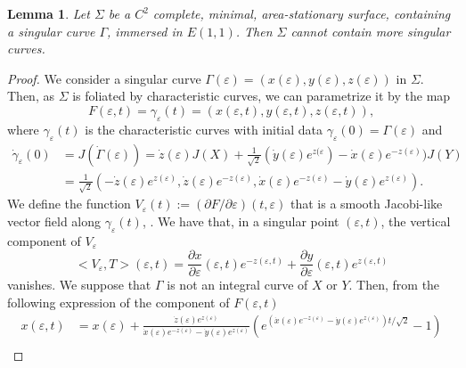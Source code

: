 \documentclass[10pt]{amsart}
\newtheorem{lemma}[theorem]{Lemma}
\theoremstyle{definition}
\theoremstyle{remark}
\numberwithin{equation}{section}
\begin{document}
\begin{lemma} Let ${\Sigma}$ be a $C^2$ complete, minimal, area-stationary surface, containing a singular curve ${\Gamma}$, immersed in ${E(1,1)}$. Then ${\Sigma}$ cannot contain more singular curves. 
\end{lemma}

\begin{proof} We consider a singular curve ${\Gamma}({\varepsilon})=(x({\varepsilon}),y({\varepsilon}),z({\varepsilon}))$ in ${\Sigma}$. Then, as ${\Sigma}$ is foliated by characteristic curves, we can parametrize it by the map 
\[
F({\varepsilon},t)={\gamma}_{\varepsilon}(t)=(x({\varepsilon},t),y({\varepsilon},t),z({\varepsilon},t)),
\]
where ${\gamma}_{\varepsilon}(t)$ is the characteristic curves with initial data ${\gamma}_{\varepsilon}(0)={\Gamma}({\varepsilon})$ and 
\begin{equation}
\begin{split}
\dot{\gamma}_{\varepsilon}(0)&=J(\dot{\Gamma}({\varepsilon}))=\dot{z}({\varepsilon})J(X)+\frac{1}{\sqrt{2}}(\dot{y}({\varepsilon})e^{z({\varepsilon}})-\dot{x}({\varepsilon})e^{-z({\varepsilon})})J(Y)\\
&=  \frac{1}{\sqrt{2}}(-\dot{z}({\varepsilon})e^{z({\varepsilon})},\dot{z}({\varepsilon})e^{-z({\varepsilon})},\dot{x}({\varepsilon})e^{-z({\varepsilon})}-\dot{y}({\varepsilon})e^{z({\varepsilon})}).
\end{split}
\end{equation}
We define the function $V_{\varepsilon}(t):=(\partial F/\partial {\varepsilon})(t,{\varepsilon})$ that is a smooth Jacobi-like vector field along ${\gamma}_{\varepsilon}(t)$, \cite[Section~4]{MR3044134}. We have that, in a singular point $({\varepsilon},t)$, the vertical component of $V_{\varepsilon}$ 
\[
{\big<{V_{\varepsilon},T}\big>}({\varepsilon},t)=\frac{\partial x}{\partial{\varepsilon}}({\varepsilon},t)e^{-z({\varepsilon},t)}+\frac{\partial y}{\partial{\varepsilon}}({\varepsilon},t)e^{z({\varepsilon},t)}
\]
vanishes. We suppose that ${\Gamma}$ is not an integral curve of $X$ or $Y$. Then, from the following expression of the component of $F({\varepsilon},t)$
\begin{equation}\label{eq:parametrizzazionecurvaorizzontale}
\begin{split}
x({\varepsilon},t)&=x({\varepsilon})+\frac{\dot{z}({\varepsilon})e^{z({\varepsilon})}}{\dot{x}({\varepsilon})e^{-z({\varepsilon})}-\dot{y}({\varepsilon})e^{z({\varepsilon})}}(e^{(\dot{x}({\varepsilon})e^{-z({\varepsilon})}-\dot{y}({\varepsilon})e^{z({\varepsilon})})t/\sqrt{2}}-1)\\

\end{split}
\end{equation}
\end{proof}
\end{document}
